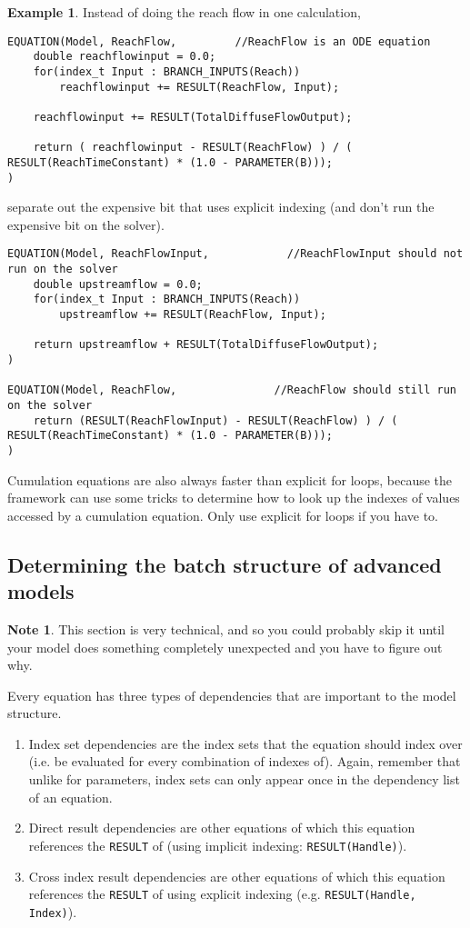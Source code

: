 \documentclass[11pt]{article}
\theoremstyle{definition}
\newtheorem{mynote}{Note}
\newenvironment{note}%
  {\begin{lrbox}{\notebox}%
   \begin{minipage}{\dimexpr\linewidth-2\fboxsep}
   \begin{mynote}}%
  {\end{mynote}%
   \end{minipage}%
   \end{lrbox}%
   \begin{trivlist}
     \item[]\colorbox{silver}{\usebox\notebox}
   \end{trivlist}}
\newtheorem{myexample}{Example}
\newenvironment{example}%
  {\begin{lrbox}{\examplebox}%
   \begin{minipage}{\dimexpr\linewidth-2\fboxsep}
   \begin{myexample}}%
  {\end{myexample}%
   \end{minipage}%
   \end{lrbox}%
   \begin{trivlist}
     \item[]\colorbox{silver}{\usebox\examplebox}
   \end{trivlist}}
\begin{document}
\begin{example}
Instead of doing the reach flow in one calculation,
\begin{lstlisting}[style=mycpp]
EQUATION(Model, ReachFlow,         //ReachFlow is an ODE equation
	double reachflowinput = 0.0;
	for(index_t Input : BRANCH_INPUTS(Reach))
		reachflowinput += RESULT(ReachFlow, Input);
	
	reachflowinput += RESULT(TotalDiffuseFlowOutput);	

	return ( reachflowinput - RESULT(ReachFlow) ) / ( RESULT(ReachTimeConstant) * (1.0 - PARAMETER(B)));
)
\end{lstlisting}
separate out the expensive bit that uses explicit indexing (and don't run the expensive bit on the solver).
\begin{lstlisting}[style=mycpp]
EQUATION(Model, ReachFlowInput,            //ReachFlowInput should not run on the solver
	double upstreamflow = 0.0;
	for(index_t Input : BRANCH_INPUTS(Reach))
		upstreamflow += RESULT(ReachFlow, Input);
	
	return upstreamflow + RESULT(TotalDiffuseFlowOutput);
)

EQUATION(Model, ReachFlow,               //ReachFlow should still run on the solver
	return (RESULT(ReachFlowInput) - RESULT(ReachFlow) ) / ( RESULT(ReachTimeConstant) * (1.0 - PARAMETER(B)));
)
\end{lstlisting}
\end{example}

Cumulation equations are also always faster than explicit for loops, because the framework can use some tricks to determine how to look up the indexes of values accessed by a cumulation equation. Only use explicit for loops if you have to.

\subsection{Determining the batch structure of advanced models}\label{sec:advancedbatchstructure}

\begin{note}
This section is very technical, and so you could probably skip it until your model does something completely unexpected and you have to figure out why.
\end{note}

Every equation has three types of dependencies that are important to the model structure.
\begin{enumerate}[i]
\item Index set dependencies are the index sets that the equation should index over (i.e. be evaluated for every combination of indexes of). Again, remember that unlike for parameters, index sets can only appear once in the dependency list of an equation.
\item Direct result dependencies are other equations of which this equation references the {\tt RESULT} of (using implicit indexing: {\tt RESULT(Handle)}).
\item Cross index result dependencies are other equations of which this equation references the {\tt RESULT} of using explicit indexing (e.g. {\tt RESULT(Handle, Index)}).
\end{enumerate}
\end{document}
